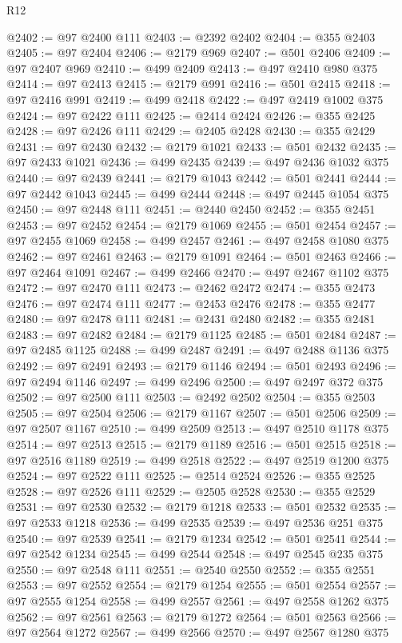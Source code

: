 \begin{lexlean}{R12}
\begin{coremodule}
{{{{{{{{{{{{{{{{{{{{{{{{{{{{{{{{{{{{{{{{{{{{{{{{{{{{{{{{{{{{{{{{{{{{{{{{{{{{{{{{{{@2402 := @97 @2400 @111
@2403 := @2392 @2402
@2404 := @355 @2403
@2405 := @97 @2404
@2406 := @2179 @969
@2407 := @501 @2406
@2409 := @97 @2407 @969
@2410 := @499 @2409
@2413 := @497 @2410 @980 @375
@2414 := @97 @2413
@2415 := @2179 @991
@2416 := @501 @2415
@2418 := @97 @2416 @991
@2419 := @499 @2418
@2422 := @497 @2419 @1002 @375
@2424 := @97 @2422 @111
@2425 := @2414 @2424
@2426 := @355 @2425
@2428 := @97 @2426 @111
@2429 := @2405 @2428
@2430 := @355 @2429
@2431 := @97 @2430
@2432 := @2179 @1021
@2433 := @501 @2432
@2435 := @97 @2433 @1021
@2436 := @499 @2435
@2439 := @497 @2436 @1032 @375
@2440 := @97 @2439
@2441 := @2179 @1043
@2442 := @501 @2441
@2444 := @97 @2442 @1043
@2445 := @499 @2444
@2448 := @497 @2445 @1054 @375
@2450 := @97 @2448 @111
@2451 := @2440 @2450
@2452 := @355 @2451
@2453 := @97 @2452
@2454 := @2179 @1069
@2455 := @501 @2454
@2457 := @97 @2455 @1069
@2458 := @499 @2457
@2461 := @497 @2458 @1080 @375
@2462 := @97 @2461
@2463 := @2179 @1091
@2464 := @501 @2463
@2466 := @97 @2464 @1091
@2467 := @499 @2466
@2470 := @497 @2467 @1102 @375
@2472 := @97 @2470 @111
@2473 := @2462 @2472
@2474 := @355 @2473
@2476 := @97 @2474 @111
@2477 := @2453 @2476
@2478 := @355 @2477
@2480 := @97 @2478 @111
@2481 := @2431 @2480
@2482 := @355 @2481
@2483 := @97 @2482
@2484 := @2179 @1125
@2485 := @501 @2484
@2487 := @97 @2485 @1125
@2488 := @499 @2487
@2491 := @497 @2488 @1136 @375
@2492 := @97 @2491
@2493 := @2179 @1146
@2494 := @501 @2493
@2496 := @97 @2494 @1146
@2497 := @499 @2496
@2500 := @497 @2497 @372 @375
@2502 := @97 @2500 @111
@2503 := @2492 @2502
@2504 := @355 @2503
@2505 := @97 @2504
@2506 := @2179 @1167
@2507 := @501 @2506
@2509 := @97 @2507 @1167
@2510 := @499 @2509
@2513 := @497 @2510 @1178 @375
@2514 := @97 @2513
@2515 := @2179 @1189
@2516 := @501 @2515
@2518 := @97 @2516 @1189
@2519 := @499 @2518
@2522 := @497 @2519 @1200 @375
@2524 := @97 @2522 @111
@2525 := @2514 @2524
@2526 := @355 @2525
@2528 := @97 @2526 @111
@2529 := @2505 @2528
@2530 := @355 @2529
@2531 := @97 @2530
@2532 := @2179 @1218
@2533 := @501 @2532
@2535 := @97 @2533 @1218
@2536 := @499 @2535
@2539 := @497 @2536 @251 @375
@2540 := @97 @2539
@2541 := @2179 @1234
@2542 := @501 @2541
@2544 := @97 @2542 @1234
@2545 := @499 @2544
@2548 := @497 @2545 @235 @375
@2550 := @97 @2548 @111
@2551 := @2540 @2550
@2552 := @355 @2551
@2553 := @97 @2552
@2554 := @2179 @1254
@2555 := @501 @2554
@2557 := @97 @2555 @1254
@2558 := @499 @2557
@2561 := @497 @2558 @1262 @375
@2562 := @97 @2561
@2563 := @2179 @1272
@2564 := @501 @2563
@2566 := @97 @2564 @1272
@2567 := @499 @2566
@2570 := @497 @2567 @1280 @375
}}}}}}}}}}}}}}}}}}}}}}}}}}}}}}}}}}}}}}}}}}}}}}}}}}}}}}}}}}}}}}}}}}}}}}}}}}}}}}}}}}
\end{coremodule}
\end{lexlean}
